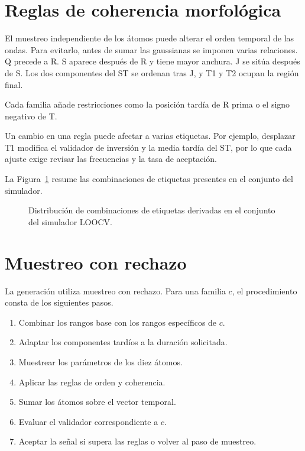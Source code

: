 \section{Reglas de coherencia morfológica}

El muestreo independiente de los átomos puede alterar el orden temporal de las ondas. Para evitarlo, antes de sumar las gaussianas se imponen varias relaciones. Q precede a R. S aparece después de R y tiene mayor anchura. J se sitúa después de S. Los dos componentes del ST se ordenan tras J, y T1 y T2 ocupan la región final.

Cada familia añade restricciones como la posición tardía de R prima o el signo negativo de T.

\begin{samepage}
Un cambio en una regla puede afectar a varias etiquetas. Por ejemplo, desplazar T1 modifica el validador de inversión y la media tardía del ST, por lo que cada ajuste exige revisar las frecuencias y la tasa de aceptación.
\par
\end{samepage}

La Figura~\ref{fig:label_distribution} resume las combinaciones de etiquetas presentes en el conjunto del simulador.

\begin{figure}[H]
  \centering
  \caption{Distribución de combinaciones de etiquetas derivadas en el conjunto del simulador LOOCV.}
  \label{fig:label_distribution}
\end{figure}

\section{Muestreo con rechazo}

La generación utiliza muestreo con rechazo. Para una familia \(c\), el procedimiento consta de los siguientes pasos.

\begin{enumerate}
\item Combinar los rangos base con los rangos específicos de \(c\).
\item Adaptar los componentes tardíos a la duración solicitada.
\item Muestrear los parámetros de los diez átomos.
\item Aplicar las reglas de orden y coherencia.
\item Sumar los átomos sobre el vector temporal.
\item Evaluar el validador correspondiente a \(c\).
\item Aceptar la señal si supera las reglas o volver al paso de muestreo.
\end{enumerate}

